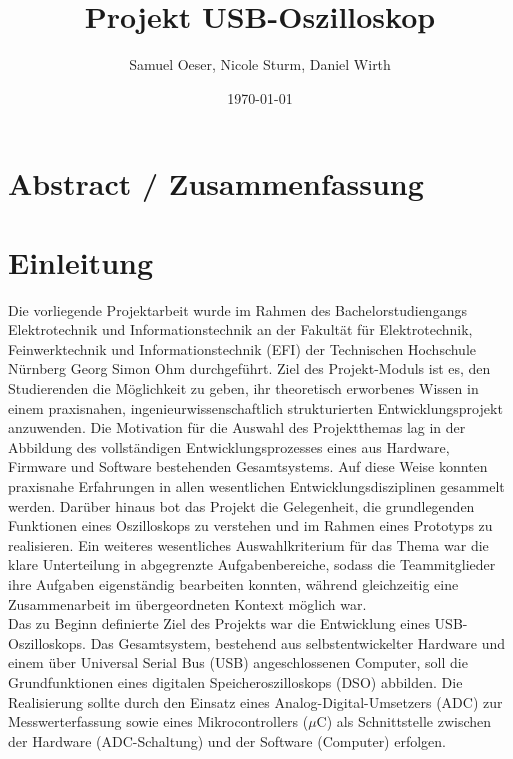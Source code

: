 \documentclass[a4paper, portrait, 12pt]{scrartcl} %
\title{Projekt USB-Oszilloskop}
\author{Samuel Oeser, Nicole Sturm, Daniel Wirth}
\date{\today}
\begin{document}

\maketitle
\pagebreak

\tableofcontents
\pagebreak

\section{Abstract / Zusammenfassung}

\pagebreak

\section{Einleitung}
Die vorliegende Projektarbeit wurde im Rahmen des Bachelorstudiengangs Elektrotechnik und Informationstechnik an der Fakultät für Elektrotechnik, Feinwerktechnik und Informationstechnik (EFI) der Technischen Hochschule Nürnberg Georg Simon Ohm durchgeführt. Ziel des Projekt-Moduls ist es, den Studierenden die Möglichkeit zu geben, ihr theoretisch erworbenes Wissen in einem praxisnahen, ingenieurwissenschaftlich strukturierten Entwicklungsprojekt anzuwenden. Die Motivation für die Auswahl des Projektthemas lag in der Abbildung des vollständigen Entwicklungsprozesses eines aus Hardware, Firmware und Software bestehenden Gesamtsystems. Auf diese Weise konnten praxisnahe Erfahrungen in allen wesentlichen Entwicklungsdisziplinen gesammelt werden. Darüber hinaus bot das Projekt die Gelegenheit, die grundlegenden Funktionen eines Oszilloskops zu verstehen und im Rahmen eines Prototyps zu realisieren. Ein weiteres wesentliches Auswahlkriterium für das Thema war die klare Unterteilung in abgegrenzte Aufgabenbereiche, sodass die Teammitglieder ihre Aufgaben eigenständig bearbeiten konnten, während gleichzeitig eine Zusammenarbeit im übergeordneten Kontext möglich war.\\

Das zu Beginn definierte Ziel des Projekts war die Entwicklung eines USB-Oszilloskops. Das Gesamtsystem, bestehend aus selbstentwickelter Hardware und einem über Universal Serial Bus (USB) angeschlossenen Computer, soll die Grundfunktionen eines digitalen Speicheroszilloskops (DSO) abbilden. Die Realisierung sollte durch den Einsatz eines Analog-Digital-Umsetzers (ADC) zur Messwerterfassung sowie eines Mikrocontrollers ($\mu$C) als Schnittstelle zwischen der Hardware (ADC-Schaltung) und der Software (Computer) erfolgen.\\
\end{document}

